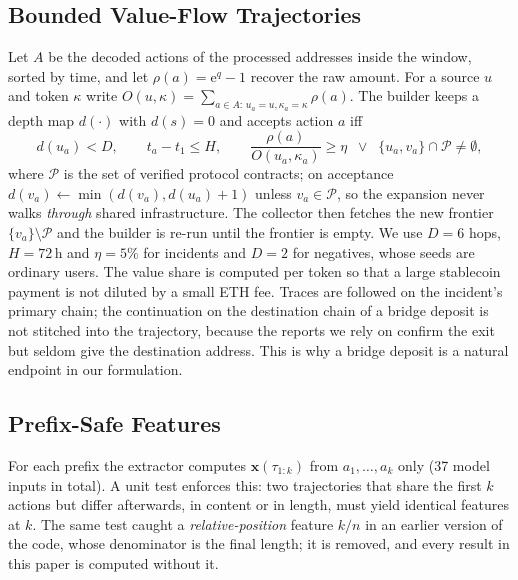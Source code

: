 \subsection{Bounded Value-Flow Trajectories}
\label{sec:traj}
Let $A$ be the decoded actions of the processed addresses inside the window, sorted by time, and let $\rho(a)=\mathrm{e}^{q}-1$ recover the raw amount.
For a source $u$ and token $\kappa$ write $O(u,\kappa)=\sum_{a\in A:\,u_a=u,\kappa_a=\kappa}\rho(a)$.
The builder keeps a depth map $d(\cdot)$ with $d(s)=0$ and accepts action $a$ iff
\begin{equation}
d(u_a)<D,\qquad t_a-t_1\le H,\qquad \frac{\rho(a)}{O(u_a,\kappa_a)}\ge\eta \;\;\lor\;\; \{u_a,v_a\}\cap\mathcal{P}\neq\emptyset,
\label{eq:builder}
\end{equation}
where $\mathcal{P}$ is the set of verified protocol contracts; on acceptance $d(v_a)\leftarrow\min(d(v_a),d(u_a)+1)$ unless $v_a\in\mathcal{P}$, so the expansion never walks \emph{through} shared infrastructure.
The collector then fetches the new frontier $\{v_a\}\setminus\mathcal{P}$ and the builder is re-run until the frontier is empty.
We use $D=6$ hops, $H=72$\,h and $\eta=5\%$ for incidents and $D=2$ for negatives, whose seeds are ordinary users.
The value share is computed per token so that a large stablecoin payment is not diluted by a small ETH fee.
Traces are followed on the incident's primary chain; the continuation on the destination chain of a bridge deposit is not stitched into the trajectory, because the reports we rely on confirm the exit but seldom give the destination address.
This is why a bridge deposit is a natural endpoint in our formulation.

\subsection{Prefix-Safe Features}
\label{sec:features}
For each prefix the extractor computes $\mathbf{x}(\tau_{1:k})$ from $a_1,\dots,a_k$ only (37 model inputs in total).
A unit test enforces this: two trajectories that share the first $k$ actions but differ afterwards, in content or in length, must yield identical features at $k$.
The same test caught a \emph{relative-position} feature $k/n$ in an earlier version of the code, whose denominator is the final length; it is removed, and every result in this paper is computed without it.


